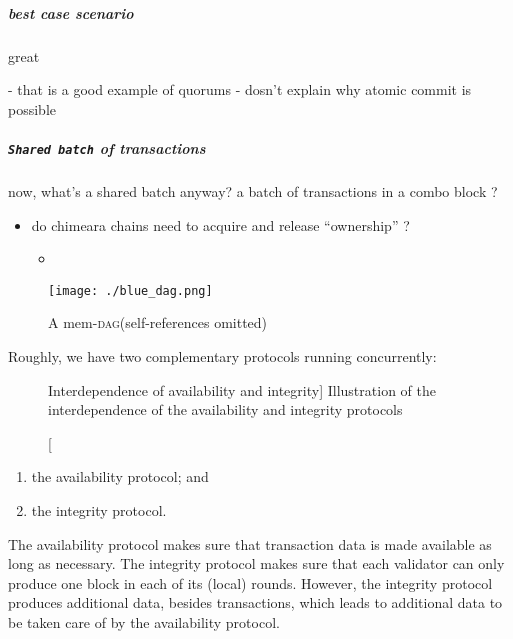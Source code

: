 \documentclass{article}
\theoremstyle{definition}
\newcommand{\Dag}[1][]{\textsc{dag}#1\xspace}
\begin{document}
\subparagraph{best case scenario}
great
\begin{markdown}
  - that is a good example of quorums
  - dosn't explain why atomic commit is possible
\end{markdown}
\subparagraph{\texttt{Shared batch} of transactions}
now,
what's a shared batch anyway?
a batch of transactions in a combo block ?




\begin{itemize}
\item 
  do chimeara chains need to acquire and release “ownership” ?


  \begin{itemize}
  \item 
  \end{itemize}

\end{itemize}








\begin{figure}[htb]
  \centering
  \texttt{[image: ./blue\_dag.png]}
  \caption{A mem-\Dag (self-references omitted)}
  \label{fig:blue_dag}
\end{figure}



Roughly, we have two complementary protocols running concurrently: 

\begin{figure}[htb]
  \centering
  
  \protect{}
  \caption%
  [Interdependence of availability and integrity]%
  {Illustration of the interdependence of the availability and integrity protocols}
  \label{fig:availability-n-integrity}
\end{figure}
 \begin{enumerate}
 \item the availability protocol; and
 \item the integrity protocol. 
 \end{enumerate}
 The availability protocol makes sure
 that transaction data is made available as long as necessary.
 The integrity protocol makes sure that 
 each validator can only produce one block in each of its (local) rounds. 
 However, %
 the integrity protocol produces additional data, %
 besides transactions, 
 which leads to additional data to be taken care of by the availability protocol.
\end{document}

